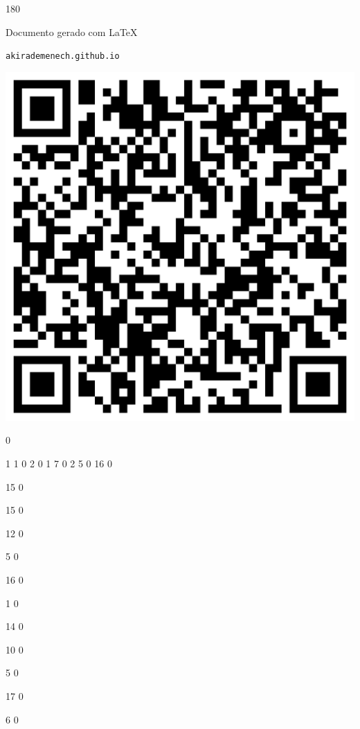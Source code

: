 \documentclass[12pt]{article}
\begin{document}
	\begin{turn}{180}	
		\begin{minipage}{\textwidth}		  
		  Documento gerado com \LaTeX			
		  
		  \texttt{akirademenech.github.io}

		  \includegraphics[height=0.3\textheight]{2e-2.pdf}

		\end{minipage}	
	\end{turn}  
		  
		\vfill  
		  
{
	0	%

	1	%
	1	%
	0	%
	2	%
	0	%
	1	%
	7	%
	0	%
	2	%
	5	%
	0	%
	16	%
	0	%

	15	%
	0	%

	15	%
	0	%

	12	%
	0	%

	5	%
	0	%

	16	%
	0	%

	1	%
	0	%

	14	%
	0	%

	10	%
	0	%

	5	%
	0	%

	17	%
	0	%

	6	%
	0	%

}	  
		    	
\end{document}
